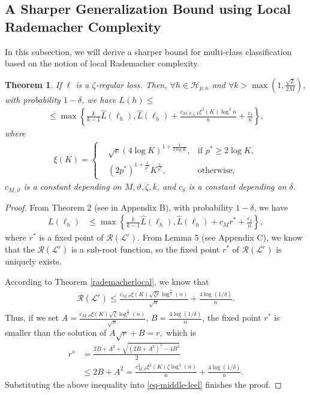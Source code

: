 \documentclass{article}
\newtheorem{theorem}{Theorem}
\begin{document}
\subsection{A Sharper Generalization Bound using Local Rademacher Complexity}
In this subsection, we will derive a sharper bound for multi-class classification based on
the notion of local Rademacher complexity.
\begin{theorem}
\label{theorem-finally}
  If $\ell$ is a $\zeta$-regular loss.
  Then, $\forall h\in\mathcal{H}_{p,\kappa}$ and $\forall k>\max(1,\frac{\sqrt{2}}{2M})$,  with probability
  $1-\delta$, we have $L(h)\leq $
  \begin{align*}
   \leq \max\left\{
        \frac{k}{k-1}\hat{L}(\ell_h),
       \hat{L}(\ell_h)+\frac{c_{M,\vartheta,\zeta, k}\xi^2(K) \log^3 n}{n}+\frac{c_{\delta}}{n}
     \right\},
\end{align*}
where \begin{align*}
  \xi(K)=
  \left\{
      \begin{aligned}
      &\sqrt{e}(4\log K)^{1+\frac{1}{2\log K}}, &\text{if } p^\ast\geq 2\log K,\\
      &(2p^\ast)^{1+\frac{1}{p^\ast}}K^{\frac{1}{p^\ast}}, &\text{otherwise},
      \end{aligned}
      \right.
  \end{align*}
  $c_{M,\vartheta}$ is a constant depending on $M,\vartheta,\zeta, k$,
  and $c_{\delta}$ is a constant depending on $\delta$.
\end{theorem}
\begin{proof}
From Theorem 2 (see in Appendix B),
with probability $1-\delta$,
we have
\begin{align}
\label{eq-middle-leel}
   L(\ell_h)&\leq \max\left\{
        \frac{k}{k-1}\hat{L}(\ell_h),
       \hat{L}(\ell_h)+c_Mr^\ast+\frac{c_\delta}{n}
     \right\},
\end{align}
where $r^\ast$ is a fixed point of $\mathcal{R}(\mathcal{L}^r)$.
From Lemma 5 (see  Appendix C),
we know that the $\mathcal{R}(\mathcal{L}^r)$ is a sub-root function,
so the fixed point $r^\ast$ of $\mathcal{R}(\mathcal{L}^r)$ is uniquely exists.

According to  Theorem \ref{rademacherlocal}, we know that
\begin{align*}
    \mathcal{R}(\mathcal{L}^r) \leq \frac{c_{M,\vartheta}\xi(K)\sqrt{\zeta r}\log^{\frac{3}{2}}(n)}{\sqrt{n}}+\frac{4\log(1/\delta)}{n}.
  \end{align*}
Thus, if we set $A=\frac{c_{M,\vartheta}\xi(K)\sqrt{\zeta}\log^{\frac{3}{2}}(n)}{\sqrt{n}}$, $B=\frac{4\log(1/\delta)}{n}$,
the fixed point $r^\ast$ is smaller than the solution of
  $
     A\sqrt{r}+B=r,
  $
   which is
   \begin{align*}
     r^s&=\frac{2B+A^2+\sqrt{(2B+A^2)^2-4B^2}}{2}\\
     &\leq 2B+A^2
     =\frac{c_{M,\vartheta}^2\xi^2(K)\zeta\log^3(n)}{n}+\frac{4\log(1/\delta)}{n}.
   \end{align*}
   Substituting the above inequality into \eqref{eq-middle-leel} finishes the proof.
\end{proof}
\end{document}
